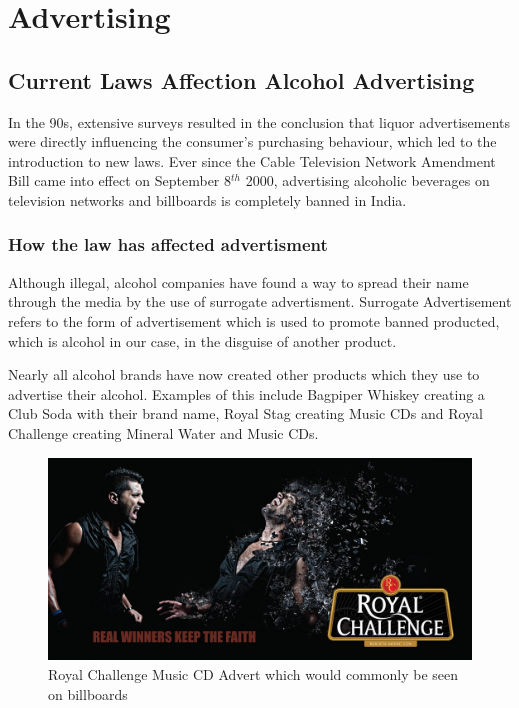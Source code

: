 \documentclass{article}
\begin{document}
\section{Advertising}
\subsection{Current Laws Affection Alcohol Advertising}
In the 90s, extensive surveys resulted in the conclusion that liquor advertisements
were directly influencing the consumer's purchasing behaviour, which led to the
introduction to new laws. Ever since the Cable Television Network Amendment Bill
came into effect on September 8$^{th}$ 2000, advertising alcoholic beverages on
television networks and billboards is completely banned in India.

\subsubsection{How the law has affected advertisment}
Although illegal, alcohol companies have found a way to spread their name through
the media by the use of surrogate advertisment. Surrogate Advertisement refers
to the form of advertisement which is used to promote banned producted, which is
alcohol in our case, in the disguise of another product.

Nearly all alcohol brands have now created other products which they use to advertise
their alcohol. Examples of this include Bagpiper Whiskey creating a Club Soda with
their brand name, Royal Stag creating Music CDs and Royal Challenge creating Mineral
Water and Music CDs.

\begin{figure}[h!]
	\caption{Royal Challenge Music CD Advert which would commonly be seen on billboards}
	\centering
		\includegraphics[width=\textwidth]{rcad1.jpg}
\end{figure}
\end{document}
